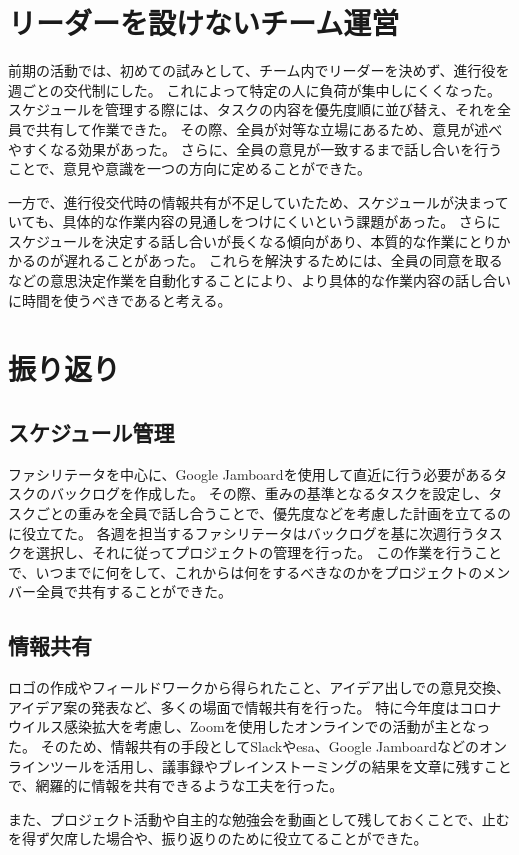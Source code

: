 \section{リーダーを設けないチーム運営}
前期の活動では、初めての試みとして、チーム内でリーダーを決めず、進行役を週ごとの交代制にした。
これによって特定の人に負荷が集中しにくくなった。
スケジュールを管理する際には、タスクの内容を優先度順に並び替え、それを全員で共有して作業できた。
その際、全員が対等な立場にあるため、意見が述べやすくなる効果があった。
さらに、全員の意見が一致するまで話し合いを行うことで、意見や意識を一つの方向に定めることができた。

一方で、進行役交代時の情報共有が不足していたため、スケジュールが決まっていても、具体的な作業内容の見通しをつけにくいという課題があった。
さらにスケジュールを決定する話し合いが長くなる傾向があり、本質的な作業にとりかかるのが遅れることがあった。
これらを解決するためには、全員の同意を取るなどの意思決定作業を自動化することにより、より具体的な作業内容の話し合いに時間を使うべきであると考える。

\section{振り返り}
\subsection{スケジュール管理}
ファシリテータを中心に、Google Jamboardを使用して直近に行う必要があるタスクのバックログを作成した。
その際、重みの基準となるタスクを設定し、タスクごとの重みを全員で話し合うことで、優先度などを考慮した計画を立てるのに役立てた。
各週を担当するファシリテータはバックログを基に次週行うタスクを選択し、それに従ってプロジェクトの管理を行った。
この作業を行うことで、いつまでに何をして、これからは何をするべきなのかをプロジェクトのメンバー全員で共有することができた。

\subsection{情報共有}
ロゴの作成やフィールドワークから得られたこと、アイデア出しでの意見交換、アイデア案の発表など、多くの場面で情報共有を行った。
特に今年度はコロナウイルス感染拡大を考慮し、Zoomを使用したオンラインでの活動が主となった。
そのため、情報共有の手段としてSlackやesa、Google Jamboardなどのオンラインツールを活用し、議事録やブレインストーミングの結果を文章に残すことで、網羅的に情報を共有できるような工夫を行った。

また、プロジェクト活動や自主的な勉強会を動画として残しておくことで、止むを得ず欠席した場合や、振り返りのために役立てることができた。
